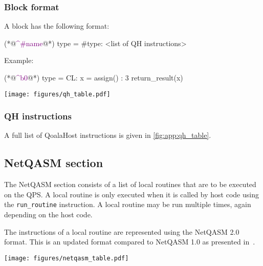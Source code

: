 \subsubsection{Block format}

A block has the following format:
\begin{qoalacode}
(*@\textcolor{purple}{\textasciicircum \#name}@*) {type = #type}:
    <list of QH instructions>
\end{qoalacode}

Example:
\begin{qoalacode}
(*@\textcolor{purple}{\textasciicircum b0}@*) {type = CL}:
    x = assign() : 3
    return_result(x)
\end{qoalacode}


\begin{figure*}
    \centering
    \texttt{[image: figures/qh\_table.pdf]}
    \caption{Overview of all host code (QoalaHost) instructions, their syntax and their semantics.}
    \label{fig:app:qh_table}
\end{figure*}

\subsubsection{QH instructions}
A full list of QoalaHost instructions is given in \cref{fig:app:qh_table}.


\subsection{NetQASM section}
\label{app:netqasm}
The NetQASM section consists of a list of local routines that are to be executed on the QPS.
A local routine is only executed when it is called by host code using the \texttt{run\_routine} instruction. A local routine may be run multiple times, again depending on the host code.

The instructions of a local routine are represented using the NetQASM 2.0 format.
This is an updated format compared to NetQASM 1.0 as presented in~\cite{dahlberg2022netqasm}.

\begin{figure*}
    \centering
    \texttt{[image: figures/netqasm\_table.pdf]}
    \caption{Overview of all NetQASM classical instructions, their syntax and their semantics.
    Quantum instructions depend on the particular flavour~\cite{dahlberg2022netqasm} that is being used.
    Semantics of quotient and remainder for non-positive integers are the same as in the C language standard.
    Note that \texttt{jmp 1} is a no-op.}
    \label{fig:app:netqasm_table}
\end{figure*}


